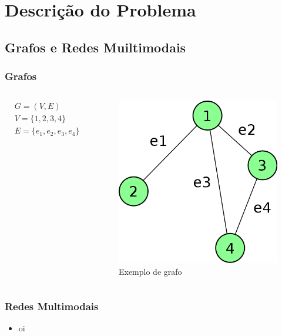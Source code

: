 \section{Descrição do Problema}

\subsection{Grafos e Redes Muiltimodais}
\frame
{
\frametitle{Grafos}
\begin{columns}[c]
\column{1.5in}
	\begin{align*}
		& G = (V,E) \\
		& V = \{1,2,3,4\} \\
		& E = \{e_1,e_2,e_3,e_4\}
	\end{align*}
\column{1.5in}
	\begin{figure}
		\includegraphics[width=\textwidth]{./imgs/grafo.png}
		\caption{Exemplo de grafo}
	\end{figure}
\end{columns}
}

\frame
{
\frametitle{Redes Multimodais}
\begin{itemize}
	\item oi
\end{itemize}
}
